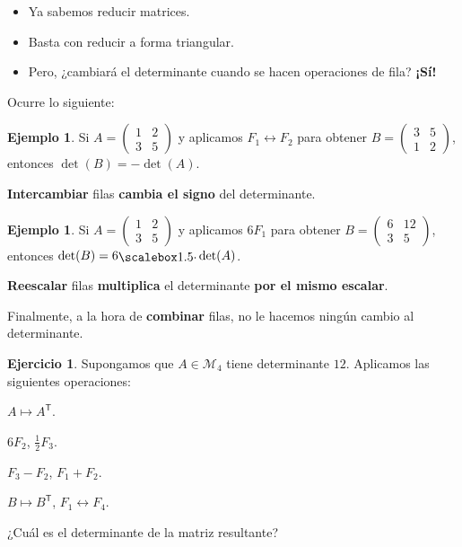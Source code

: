 \documentclass[12pt]{article}
\theoremstyle{plain}
\theoremstyle{definition}
\newtheorem{Ex}[Th]{Ejemplo}           %
\newtheorem{Ej}[Th]{Ejercicio}         %
\theoremstyle{remark}
\newcommand{\cM}{\mathcal{M}}       %
\newcommand{\sT}{\mathsf{T}}        %
\renewcommand{\:}{\colon}           %
\renewcommand{\.}{\Cdot}                %
\begin{document}
\begin{multicols}{2}
\begin{itemize}
  \item Ya sabemos reducir matrices.
  \item Basta con reducir a forma triangular.
  \item Pero, ¿cambiará el determinante cuando se hacen operaciones de fila? \textbf{¡Sí!}
\end{itemize}
Ocurre lo siguiente:
\begin{Ex}
  Si $A=\begin{pmatrix}
    1&2\\3&5
  \end{pmatrix}$ y aplicamos $F_1\leftrightarrow F_2$ para obtener $B=\begin{pmatrix}
    3&5\\1&2
  \end{pmatrix}$, entonces $\det(B)=-\det(A)$.\par 
  \textbf{Intercambiar} filas \textbf{cambia el signo} del determinante.
\end{Ex}

\begin{Ex}
  Si $A=\begin{pmatrix}
    1&2\\3&5
  \end{pmatrix}$ y aplicamos $6F_1$ para obtener $B=\begin{pmatrix}
    6&12\\3&5
  \end{pmatrix}$, entonces $\det(B)=6\.\det(A)$.\par 
  \textbf{Reescalar} filas \textbf{multiplica} el determinante \textbf{por el mismo escalar}.
\end{Ex}

Finalmente, a la hora de \textbf{combinar} filas, no le hacemos ningún cambio al determinante.

\begin{Ej}
  Supongamos que $A\in\cM_4$ tiene determinante $12$. Aplicamos las siguientes operaciones:
  \begin{enumerate}\begin{multicols*}{2}
    \item $A\mapsto A^\sT$.
    \item $6F_2$, $\frac{1}{2}F_3$.
    \item $F_3-F_2$, $F_1+F_2$.
    \item $B\mapsto B^\sT$, $F_1\leftrightarrow F_4$.
  \end{multicols*}
  \end{enumerate}
  ¿Cuál es el determinante de la matriz resultante?
\end{Ej}
\vfill\null
\columnbreak

\end{multicols}
\end{document}

